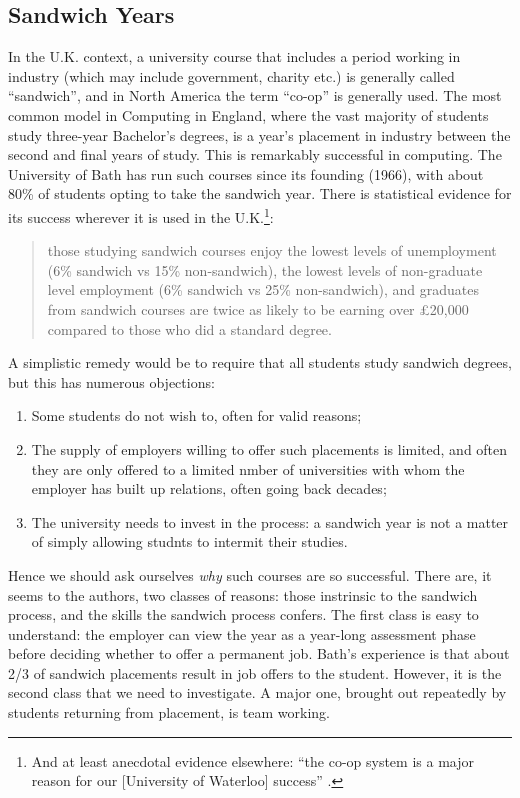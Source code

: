 \documentclass[sigconf]{acmart}
\begin{document}
\subsection{Sandwich Years}
In the U.K. context, a university course that includes a period working in industry (which may include government, charity etc.) is generally called ``sandwich'', and in North America the term ``co-op'' is generally used. The most common model in Computing in England, where the vast majority of students study three-year Bachelor's degrees, is a year's placement in industry between the second and final years of study. This is remarkably successful in computing. The University of Bath has run such courses since its founding (1966), with about 80\% of students opting to take the sandwich year. There is statistical evidence for its success wherever it is used in the U.K.\footnote{And at least anecdotal evidence elsewhere: ``the co-op system is a major reason for our [University of Waterloo] success'' \cite{Watt2017a}.}:
\begin{quote}
those studying sandwich courses enjoy the lowest levels of unemployment (6\% sandwich vs 15\% non-sandwich), the lowest levels of non-graduate level employment (6\% sandwich vs 25\% non-sandwich), and graduates from sandwich courses are twice as likely to be earning over \pounds20,000 compared to those who did a standard degree. \cite[\P2.5]{Shadbolt2016a}
\end{quote}
A simplistic remedy would be to require that all students study sandwich degrees, but this has numerous objections:
\begin{enumerate}
\item Some students do not wish to, often for valid reasons;
\item The supply of employers willing to offer such placements is limited, and often they are only offered to a limited nmber of universities with whom the employer has built up relations, often going back decades;
\item The university needs to invest in the process: a sandwich year is not a matter of simply allowing studnts to intermit their studies.
\end{enumerate}
Hence we should ask ourselves \emph{why} such courses are so successful.  There are, it seems to the authors, two classes of reasons: those instrinsic to the sandwich process, and the skills the sandwich process confers. The first class is easy to understand: the employer can view the year as a year-long assessment phase before deciding whether to offer a permanent job. Bath's experience is that about 2/3 of sandwich placements result in job offers to the student. However, it is the second class that we need to investigate. A major one, brought out repeatedly by students returning from placement, is team working.
\end{document}
